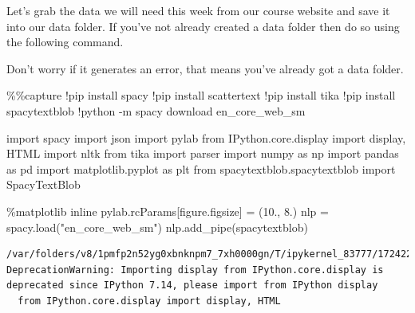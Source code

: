 \documentclass[
  letterpaper,
  DIV=11,
  numbers=noendperiod]{scrreprt}
\newenvironment{Shaded}{\begin{snugshade}}{\end{snugshade}}
\newcommand{\FloatTok}[1]{\textcolor[rgb]{0.68,0.00,0.00}{#1}}
\newcommand{\ImportTok}[1]{\textcolor[rgb]{0.00,0.46,0.62}{#1}}
\newcommand{\NormalTok}[1]{\textcolor[rgb]{0.00,0.23,0.31}{#1}}
\newcommand{\OperatorTok}[1]{\textcolor[rgb]{0.37,0.37,0.37}{#1}}
\newcommand{\StringTok}[1]{\textcolor[rgb]{0.13,0.47,0.30}{#1}}
\begin{document}
Let's grab the data we will need this week from our course website and
save it into our data folder. If you've not already created a data
folder then do so using the following command.

Don't worry if it generates an error, that means you've already got a
data folder.

\begin{Shaded}
\begin{Highlighting}[]
\OperatorTok{\%\%}\NormalTok{capture}
\OperatorTok{!}\NormalTok{pip install spacy}
\OperatorTok{!}\NormalTok{pip install scattertext}
\OperatorTok{!}\NormalTok{pip install tika}
\OperatorTok{!}\NormalTok{pip install spacytextblob}
\OperatorTok{!}\NormalTok{python }\OperatorTok{{-}}\NormalTok{m spacy download en\_core\_web\_sm}
\end{Highlighting}
\end{Shaded}

\begin{Shaded}
\begin{Highlighting}[]
\ImportTok{import}\NormalTok{ spacy}
\ImportTok{import}\NormalTok{ json}
\ImportTok{import}\NormalTok{ pylab}
\ImportTok{from}\NormalTok{ IPython.core.display }\ImportTok{import}\NormalTok{ display, HTML}
\ImportTok{import}\NormalTok{ nltk}
\ImportTok{from}\NormalTok{ tika }\ImportTok{import}\NormalTok{ parser}
\ImportTok{import}\NormalTok{ numpy }\ImportTok{as}\NormalTok{ np}
\ImportTok{import}\NormalTok{ pandas }\ImportTok{as}\NormalTok{ pd}
\ImportTok{import}\NormalTok{ matplotlib.pyplot }\ImportTok{as}\NormalTok{ plt}
\ImportTok{from}\NormalTok{ spacytextblob.spacytextblob }\ImportTok{import}\NormalTok{ SpacyTextBlob}

\OperatorTok{\%}\NormalTok{matplotlib inline}
\NormalTok{pylab.rcParams[}\StringTok{\textquotesingle{}figure.figsize\textquotesingle{}}\NormalTok{] }\OperatorTok{=}\NormalTok{ (}\FloatTok{10.}\NormalTok{, }\FloatTok{8.}\NormalTok{)}
\NormalTok{nlp }\OperatorTok{=}\NormalTok{ spacy.load(}\StringTok{"en\_core\_web\_sm"}\NormalTok{)}
\NormalTok{nlp.add\_pipe(}\StringTok{\textquotesingle{}spacytextblob\textquotesingle{}}\NormalTok{)}
\end{Highlighting}
\end{Shaded}

\begin{verbatim}
/var/folders/v8/1pmfp2n52yg0xbnknpm7_7xh0000gn/T/ipykernel_83777/1724223035.py:4: DeprecationWarning: Importing display from IPython.core.display is deprecated since IPython 7.14, please import from IPython display
  from IPython.core.display import display, HTML
\end{verbatim}
\end{document}

